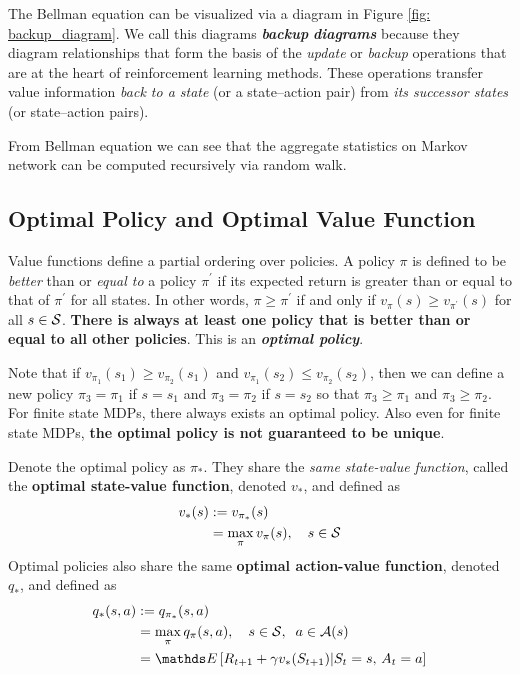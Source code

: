 \documentclass[11pt]{article}
\begin{document}
The Bellman equation can be visualized via a diagram in Figure \ref{fig: backup_diagram}. We call this diagrams \emph{\textbf{backup}} \emph{\textbf{diagrams}} because they diagram relationships that form the basis of the \emph{update} or \emph{backup} operations that are at the heart of reinforcement learning methods. These operations transfer value information \emph{back to a state} (or a state–action pair) from \emph{its successor states} (or state–action pairs). 

From Bellman equation we can see that the aggregate statistics on Markov network can be computed recursively via random walk. 

\subsection{Optimal Policy and Optimal Value Function}
Value functions define a partial ordering over policies. A policy $\pi$ is defined to be \emph{better} than or \emph{equal to} a policy $\pi^{'}$ if its expected return is greater than or equal to that of $\pi^{'}$ for all states. In other words, $\pi \ge \pi^{'}$ if and only if $v_{\pi}(s) \ge v_{\pi^{'}}(s)$ for all $s \in {\mathcal S}$. \textbf{There is always at least one policy that is better than or equal to all other policies}. This is an \emph{\textbf{optimal policy}}. 

Note that if $v_{\pi_{1}}(s_{1}) \ge v_{\pi_{2}}(s_{1})$ and $v_{\pi_{1}}(s_{2}) \le v_{\pi_{2}}(s_2)$, then we can define a new policy $\pi_{3} = \pi_{1}$ if $s=s_{1}$ and $\pi_{3} = \pi_{2}$ if $s=s_{2}$ so that $\pi_{3} \ge \pi_{1}$ and $\pi_{3} \ge \pi_{2}$. For finite state MDPs, there always exists an optimal policy. Also even for finite state MDPs, \textbf{the optimal policy is not guaranteed to be unique}. 

Denote the optimal policy as $\pi_{*}$. They share the \emph{same state-value function}, called the \textbf{optimal state-value function}, denoted $v_{*}$, and defined as
\begin{align}
v_{*}(s) &:= v_{\pi_{*}}(s) \nonumber\\
&= \max_{\pi}v_{\pi}(s), \quad s\in {\mathcal S}  \label{eqn: optimal_val}
\end{align} 
Optimal policies also share the same \textbf{optimal action-value function}, denoted $q_{*}$, and defined as 
\begin{align}
q_{*}(s, a) &:= q_{\pi_{*}}(s, a) \nonumber\\
&= \max_{\pi}q_{\pi}(s, a), \quad s\in \cS, \;\; a\in \cA(s)  \label{eqn: optimal_action_val}\\
&= \E{}{R_{t+1} + \gamma v_{*}(S_{t+1}) | S_{t} = s, \, A_{t} = a}  \label{eqn: optimal_action_val2}
\end{align} 
\end{document}
